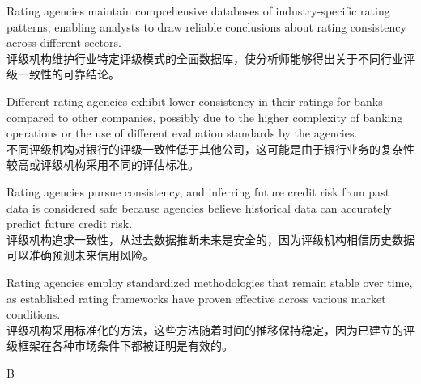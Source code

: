 \documentclass{article}
\begin{document}
    \begin{choices}
        \item Rating agencies maintain comprehensive databases of industry-specific rating patterns, enabling analysts to draw reliable conclusions about rating consistency across different sectors.\\
        评级机构维护行业特定评级模式的全面数据库，使分析师能够得出关于不同行业评级一致性的可靠结论。
        \item Different rating agencies exhibit lower consistency in their ratings for banks compared to other companies, possibly due to the higher complexity of banking operations or the use of different evaluation standards by the agencies.\\
        不同评级机构对银行的评级一致性低于其他公司，这可能是由于银行业务的复杂性较高或评级机构采用不同的评估标准。
        \item Rating agencies pursue consistency, and inferring future credit risk from past data is considered safe because agencies believe historical data can accurately predict future credit risk.\\
        评级机构追求一致性，从过去数据推断未来是安全的，因为评级机构相信历史数据可以准确预测未来信用风险。
        \item Rating agencies employ standardized methodologies that remain stable over time, as established rating frameworks have proven effective across various market conditions.\\
        评级机构采用标准化的方法，这些方法随着时间的推移保持稳定，因为已建立的评级框架在各种市场条件下都被证明是有效的。
    \end{choices}
    
    \begin{correctanswer}
        B
    \end{correctanswer}
    
\end{document}
